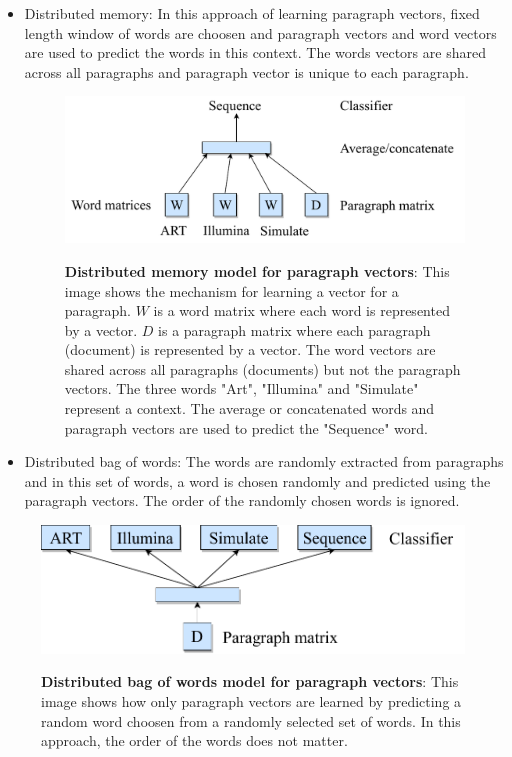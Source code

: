 \begin{itemize}
\item Distributed memory: In this approach of learning paragraph vectors, fixed length window of words are choosen and paragraph vectors and word vectors are used to predict the words in this context. The words vectors are shared across all paragraphs and paragraph vector is unique to each paragraph.

\begin{figure}[h]
\begin{centering}
    {\includegraphics[scale=0.7]{figures/dm_pv.pdf}}
    \caption[Distributed model]{\textbf{Distributed memory model for paragraph vectors}: This image shows the mechanism for learning a vector for a paragraph. $W$ is a word matrix where each word is represented by a vector. $D$ is a paragraph matrix where each paragraph (document) is represented by a vector. The word vectors are shared across all paragraphs (documents) but not the paragraph vectors. The three words "Art", "Illumina" and "Simulate" represent a context. The average or concatenated words and paragraph vectors are used to predict the "Sequence" word.}
\end{centering}
\end{figure}

\item Distributed bag of words: The words are randomly extracted from paragraphs and in this set of words, a word is chosen randomly and predicted using the paragraph vectors. The order of the randomly chosen words is ignored.  
\end{itemize}

\begin{figure}[h]
\begin{centering}
    {\includegraphics[scale=0.7]{figures/dbow_pv.pdf}}
    \caption[Distributed bag of words]{\textbf{Distributed bag of words model for paragraph vectors}: This image shows how only paragraph vectors are learned by predicting a random word choosen from a randomly selected set of words. In this approach, the order of the words does not matter.}
\end{centering}
\end{figure}

